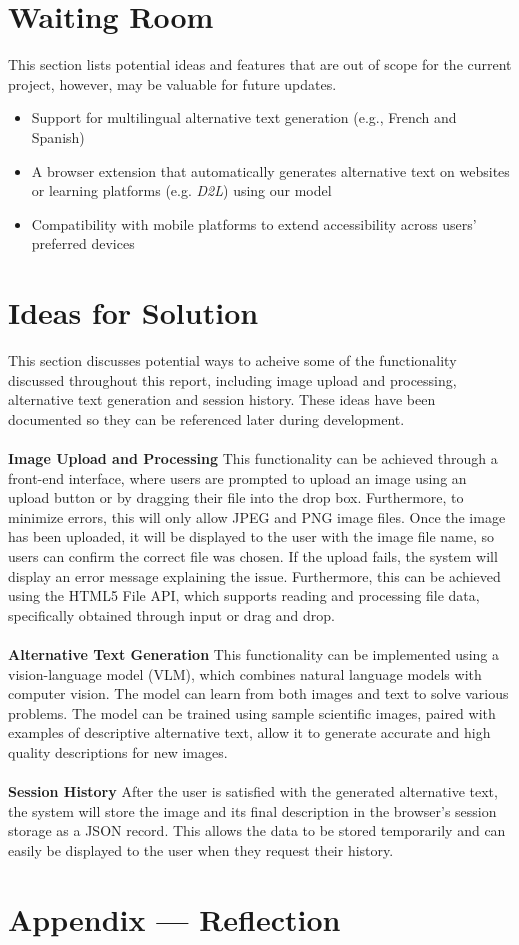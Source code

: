 \documentclass[12pt]{article}
\begin{document}
\section{Waiting Room}
This section lists potential ideas and features that are out of scope for the current project, however, may be valuable for future updates. 
\begin{itemize}
  \item Support for multilingual alternative text generation (e.g., French and Spanish)
  \item A browser extension that automatically generates alternative text on websites or learning platforms (e.g. \textit{D2L}) using our model
  \item Compatibility with mobile platforms to extend accessibility across users' preferred devices
\end{itemize}

\section{Ideas for Solution}
This section discusses potential ways to acheive some of the functionality discussed throughout this report, 
including image upload and processing, alternative text generation and session history. 
These ideas have been documented so they can be referenced later during development.\\
\\
\textbf{Image Upload and Processing}
This functionality can be achieved through a front-end interface, where users are prompted to upload an image using an upload button or by dragging their file into the drop box. Furthermore, to minimize errors, this will only allow JPEG and PNG image files. 
Once the image has been uploaded, it will be displayed to the user with the image file name, so users can confirm the correct file was chosen. 
If the upload fails, the system will display an error message explaining the issue. Furthermore, this can be achieved using the HTML5 File API, which supports reading and processing file data, specifically obtained through input or drag and drop. \\
\\
\textbf{Alternative Text Generation}
This functionality can be implemented using a vision-language model (VLM), which combines natural language models with computer vision. 
The model can learn from both images and text to solve various problems. The model can be trained using sample scientific images, paired with examples of descriptive alternative text, allow it to generate accurate and high quality descriptions for new images.\\
\\
\textbf{Session History}
After the user is satisfied with the generated alternative text, the system will store the image and its final description in the browser's session storage as a JSON record. This allows the data to be stored temporarily and can easily be displayed to the user when they request their history. \\
\section*{Appendix --- Reflection}




\end{document}
